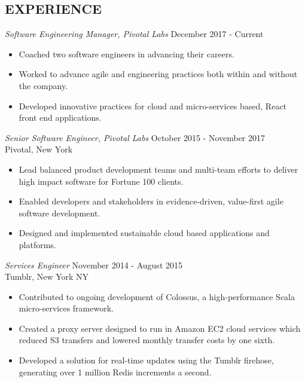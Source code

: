 \documentclass[line,margin]{res}
\begin{document}
\address{720-301-4407 / zoe@zgagnon.com}
\address{Twitter: @ZoeCraftsCode}

\begin{resume}
 
\section{EXPERIENCE}
{\sl Software Engineering Manager, Pivotal Labs} \hfill December 2017 - Current\\
\begin{itemize}
\item Coached two software engineers in advancing their careers.
\item Worked to advance agile and engineering practices both within and without the company.
\item Developed innovative practices for cloud and micro-services based, React front end applications.
\end{itemize}

{\sl Senior Software Engineer, Pivotal Labs} \hfill October 2015 - November
2017\\
Pivotal, New York
\begin{itemize}
\item Lead balanced product development teams and multi-team efforts to deliver high impact software for 
Fortune 100 clients.
\item Enabled developers and stakeholders in evidence-driven, value-first agile software development.
\item Designed and implemented sustainable cloud based applications and platforms.


\end{itemize}
{\sl Services Engineer} \hfill November 2014 - August 2015\\
Tumblr, New York NY
\begin{itemize}
\item Contributed to ongoing development of Colossus, a
high-performance Scala micro-services
framework.
\item Created a proxy server designed to run in Amazon EC2 cloud
services which reduced S3 transfers and lowered monthly transfer
costs by one sixth.
\item Developed a solution for real-time updates using the
Tumblr firehose, generating over 1 million Redis increments a
second.
\end{itemize}


\end{resume}
\end{document}
